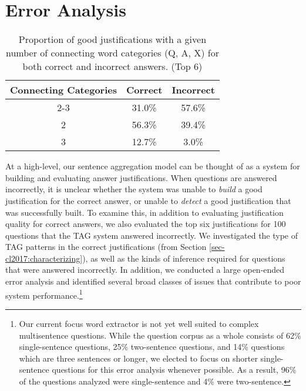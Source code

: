 \section{Error Analysis}
\label{sec-cl2017:erroranalysis}

%
%
\begin{table}[t]
\caption{{ Proportion of good justifications with a given number of connecting word categories (Q, A, X) for both correct and incorrect answers. (Top 6) }}
\small
\label{tab:errorconnectiontypes}
\begin{center}
\begin{tabular}{ccc}
\hline
\multicolumn{1}{l}{Connecting Categories} & \multicolumn{1}{c}{Correct} & \multicolumn{1}{c}{Incorrect}  \\
\cline{2-3}
\hline
1				&	31.0\%		& 57.6\%	\\
2				&	56.3\%		& 39.4\%	\\
3				&	12.7\%		& 3.0\%	\\
\end{tabular}



\end{center}
\end{table}

At a high-level, our sentence aggregation model can be thought of as a system for building and evaluating answer justifications.  When questions are answered incorrectly, it is unclear whether the system was unable to \emph{build} a good justification for the correct answer, or unable to \emph{detect} a good justification that was successfully built.  To examine this, in addition to evaluating justification quality for correct answers, we also evaluated the top six justifications for 100 questions that the TAG system answered incorrectly.  We investigated the type of TAG patterns in the correct justifications  (from Section \ref{sec-cl2017:characterizing}), as well as the kinds of inference required for questions that were answered incorrectly.  In addition, we conducted a large open-ended error analysis and identified several broad classes of issues that contribute to poor system performance.\footnote{Our current focus word extractor is not yet well suited to complex multisentence questions. While the question corpus as a whole consists of 62\% single-sentence questions, 25\% two-sentence questions, and 14\% questions which are three sentences or longer, we elected to focus on shorter single-sentence questions for this error analysis whenever possible.  As a result, 96\% of the questions analyzed were single-sentence and 4\% were two-sentence.}

